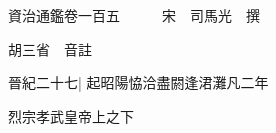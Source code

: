 






























































資治通鑑卷一百五　　　宋　司馬光　撰

胡三省　音註

晉紀二十七|{
	起昭陽恊洽盡閼逢涒灘凡二年}


烈宗孝武皇帝上之下

